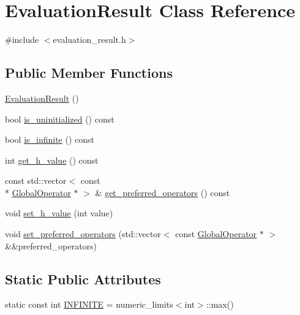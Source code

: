 \hypertarget{classEvaluationResult}{\section{Evaluation\-Result Class Reference}
\label{classEvaluationResult}
}


{\ttfamily \#include $<$evaluation\-\_\-result.\-h$>$}

\subsection*{Public Member Functions}
\begin{DoxyCompactItemize}
\item 
\hyperlink{classEvaluationResult_adbf89b19a1f34fd870ba27ec06d09946}{Evaluation\-Result} ()
\item 
bool \hyperlink{classEvaluationResult_ad56b6a8dbff00673aedb984fbe6f72a5}{is\-\_\-uninitialized} () const 
\item 
bool \hyperlink{classEvaluationResult_abdfc41d11307fe76818ee1ac70e33a12}{is\-\_\-infinite} () const 
\item 
int \hyperlink{classEvaluationResult_a19bbe29131c228b9282a0122525936f6}{get\-\_\-h\-\_\-value} () const 
\item 
const std\-::vector$<$ const \\*
\hyperlink{classGlobalOperator}{Global\-Operator} $\ast$ $>$ \& \hyperlink{classEvaluationResult_ac4063d510fb0ef6e2e7085f1e9c37ce9}{get\-\_\-preferred\-\_\-operators} () const 
\item 
void \hyperlink{classEvaluationResult_a1c562352723a4ec890f1287f1eff2e2a}{set\-\_\-h\-\_\-value} (int value)
\item 
void \hyperlink{classEvaluationResult_a7722ecb7894681875ba7f5e97b48227e}{set\-\_\-preferred\-\_\-operators} (std\-::vector$<$ const \hyperlink{classGlobalOperator}{Global\-Operator} $\ast$ $>$ \&\&preferred\-\_\-operators)
\end{DoxyCompactItemize}
\subsection*{Static Public Attributes}
\begin{DoxyCompactItemize}
\item 
static const int \hyperlink{classEvaluationResult_a3703c5ef3a8d7352936f38c71fce96a1}{I\-N\-F\-I\-N\-I\-T\-E} = numeric\-\_\-limits$<$int$>$\-::max()
\end{DoxyCompactItemize}


